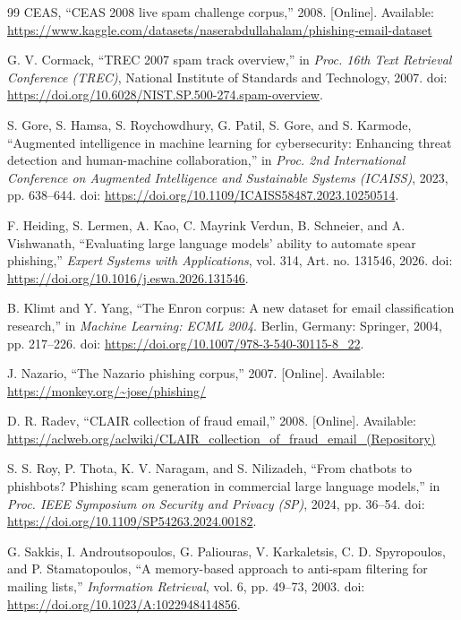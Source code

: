 \documentclass[conference]{IEEEtran}
\begin{document}
\begin{thebibliography}{99}
CEAS,
``CEAS 2008 live spam challenge corpus,''
2008. [Online]. Available:
\url{https://www.kaggle.com/datasets/naserabdullahalam/phishing-email-dataset}

G. V. Cormack,
``TREC 2007 spam track overview,''
in \emph{Proc. 16th Text Retrieval Conference (TREC)},
National Institute of Standards and Technology, 2007.
doi: \url{https://doi.org/10.6028/NIST.SP.500-274.spam-overview}.

S. Gore, S. Hamsa, S. Roychowdhury, G. Patil, S. Gore,
and S. Karmode,
``Augmented intelligence in machine learning for cybersecurity:
Enhancing threat detection and human-machine collaboration,''
in \emph{Proc. 2nd International Conference on Augmented
Intelligence and Sustainable Systems (ICAISS)}, 2023,
pp. 638--644.
doi: \url{https://doi.org/10.1109/ICAISS58487.2023.10250514}.

F. Heiding, S. Lermen, A. Kao, C. Mayrink Verdun,
B. Schneier, and A. Vishwanath,
``Evaluating large language models' ability to automate
spear phishing,''
\emph{Expert Systems with Applications}, vol. 314,
Art. no. 131546, 2026.
doi: \url{https://doi.org/10.1016/j.eswa.2026.131546}.

B. Klimt and Y. Yang,
``The Enron corpus: A new dataset for email classification research,''
in \emph{Machine Learning: ECML 2004}.
Berlin, Germany: Springer, 2004, pp. 217--226.
doi: \url{https://doi.org/10.1007/978-3-540-30115-8_22}.

J. Nazario,
``The Nazario phishing corpus,''
2007. [Online]. Available:
\url{https://monkey.org/~jose/phishing/}

D. R. Radev,
``CLAIR collection of fraud email,''
2008. [Online]. Available:
\url{https://aclweb.org/aclwiki/CLAIR_collection_of_fraud_email_(Repository)}

S. S. Roy, P. Thota, K. V. Naragam, and S. Nilizadeh,
``From chatbots to phishbots? Phishing scam generation in
commercial large language models,''
in \emph{Proc. IEEE Symposium on Security and Privacy (SP)},
2024, pp. 36--54.
doi: \url{https://doi.org/10.1109/SP54263.2024.00182}.

G. Sakkis, I. Androutsopoulos, G. Paliouras, V. Karkaletsis,
C. D. Spyropoulos, and P. Stamatopoulos,
``A memory-based approach to anti-spam filtering for mailing lists,''
\emph{Information Retrieval}, vol. 6, pp. 49--73, 2003.
doi: \url{https://doi.org/10.1023/A:1022948414856}.


\end{thebibliography}
\end{document}
